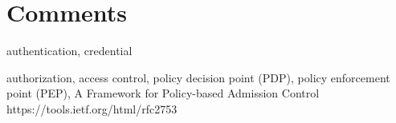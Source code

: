 \section{Comments}
\begin{sloppypar}
    authentication, 
    credential
\end{sloppypar}
\begin{sloppypar}
    authorization, 
    access control, 
    policy decision point (PDP), 
    policy enforcement point (PEP), 
    A Framework for Policy-based Admission Control https://tools.ietf.org/html/rfc2753
\end{sloppypar}








